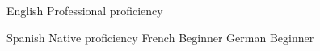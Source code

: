 
\begin{cvskills}

  \cvskill
    {English} %
    {Professional proficiency} %

  \cvskill
    {Spanish} %
    {Native proficiency} %
  \cvskill
    {French} %
    {Beginner} %
  \cvskill
    {German} %
    {Beginner} %
    
\end{cvskills}

